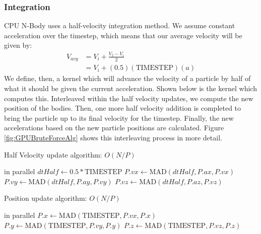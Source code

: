 \documentclass{thesis}
\begin{document}
\subsubsection{Integration}
CPU N-Body uses a half-velocity integration method. We assume constant acceleration over the timestep, which means that our average velocity will be given by:
\begin{align}
    V_{avg} &= V_i + \frac{V_f - V_i}{2}\\
            &= V_i + (0.5)(\text{TIMESTEP})(a)
\end{align}
We define, then, a kernel which will advance the velocity of a particle by half of what it should be given the current acceleration. Shown below is the kernel which computes this.
Interleaved within the half velocity updates, we compute the new position of the bodies. Then, one more half velocity addition is completed to bring the particle up to its final velocity for the timestep. Finally, the new accelerations based on the new particle positions are calculated. Figure \ref{fig:GPUBruteForceAlg} shows this interleaving process in more detail.
\begin{algorithm}
    \label{alg:HalfVelocity}
    \caption{Half Velocity update algorithm: $O(N/P)$}
    \begin{algorithmic}
         in parallel
            \State $dtHalf \gets 0.5 * \text{TIMESTEP}$
            \State $P.vx \gets \text{MAD}(dtHalf, P.ax, P.vx)$
            \State $P.vy \gets \text{MAD}(dtHalf, P.ay, P.vy)$
            \State $P.vz \gets \text{MAD}(dtHalf, P.az, P.vz)$
        \EndFor
    \end{algorithmic}
\end{algorithm}
\begin{algorithm}
    \label{alg:PositionUpdate}
    \caption{Position update algorithm: $O(N/P)$}
    \begin{algorithmic}
         in parallel
            \State $P.x \gets \text{MAD}(\text{TIMESTEP}, P.vx, P.x)$
            \State $P.y \gets \text{MAD}(\text{TIMESTEP}, P.vy, P.y)$
            \State $P.z \gets \text{MAD}(\text{TIMESTEP}, P.vz, P.z)$
        \EndFor
    \end{algorithmic}
\end{algorithm}
\end{document}
